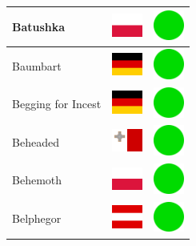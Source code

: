 \documentclass[12pt, a4paper, twoside]{report}
\begin{document}
\begin{center}
\begin{longtable}{|p{5cm}|p{2cm}|p{2cm}|}
 Batushka                                                   & \includegraphics[width=1cm]{../img/flags/pl} &   \includegraphics[width=1cm]{../likes/y} \\ \hline
 Baumbart                                                   & \includegraphics[width=1cm]{../img/flags/de} &   \includegraphics[width=1cm]{../likes/y} \\ \hline
 Begging for Incest                                         & \includegraphics[width=1cm]{../img/flags/de} &   \includegraphics[width=1cm]{../likes/y} \\ \hline
 Beheaded                                                   & \includegraphics[width=1cm]{../img/flags/mt} &   \includegraphics[width=1cm]{../likes/y} \\ \hline
 Behemoth                                                   & \includegraphics[width=1cm]{../img/flags/pl} &   \includegraphics[width=1cm]{../likes/y} \\ \hline
 Belphegor                                                  & \includegraphics[width=1cm]{../img/flags/at} &   \includegraphics[width=1cm]{../likes/y} \\ \hline

\end{longtable}
\end{center}
\end{document}
